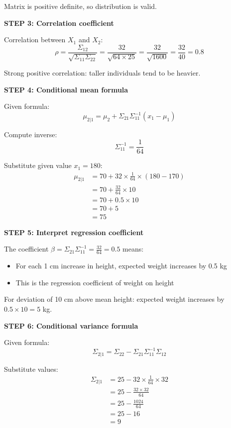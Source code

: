 \documentclass[12pt]{article}
\begin{document}
\begin{solution}
Matrix is positive definite, so distribution is valid.

\textbf{STEP 3: Correlation coefficient}

Correlation between $X_1$ and $X_2$:
\[
\rho = \frac{\Sigma_{12}}{\sqrt{\Sigma_{11}\Sigma_{22}}} = \frac{32}{\sqrt{64 \times 25}} = \frac{32}{\sqrt{1600}} = \frac{32}{40} = 0.8
\]

Strong positive correlation: taller individuals tend to be heavier.

\textbf{STEP 4: Conditional mean formula}

Given formula:
\[
\mu_{2|1} = \mu_2 + \Sigma_{21}\Sigma_{11}^{-1}(x_1 - \mu_1)
\]

Compute inverse:
\[
\Sigma_{11}^{-1} = \frac{1}{64}
\]

Substitute given value $x_1 = 180$:
\begin{align*}
\mu_{2|1} &= 70 + 32 \times \frac{1}{64} \times (180 - 170) \\
&= 70 + \frac{32}{64} \times 10 \\
&= 70 + 0.5 \times 10 \\
&= 70 + 5 \\
&= 75
\end{align*}

\textbf{STEP 5: Interpret regression coefficient}

The coefficient $\beta = \Sigma_{21}\Sigma_{11}^{-1} = \frac{32}{64} = 0.5$ means:
\begin{itemize}
    \item For each 1 cm increase in height, expected weight increases by 0.5 kg
    \item This is the regression coefficient of weight on height
\end{itemize}

For deviation of 10 cm above mean height: expected weight increases by $0.5 \times 10 = 5$ kg.

\textbf{STEP 6: Conditional variance formula}

Given formula:
\[
\Sigma_{2|1} = \Sigma_{22} - \Sigma_{21}\Sigma_{11}^{-1}\Sigma_{12}
\]

Substitute values:
\begin{align*}
\Sigma_{2|1} &= 25 - 32 \times \frac{1}{64} \times 32 \\
&= 25 - \frac{32 \times 32}{64} \\
&= 25 - \frac{1024}{64} \\
&= 25 - 16 \\
&= 9
\end{align*}


\end{solution}
\end{document}
